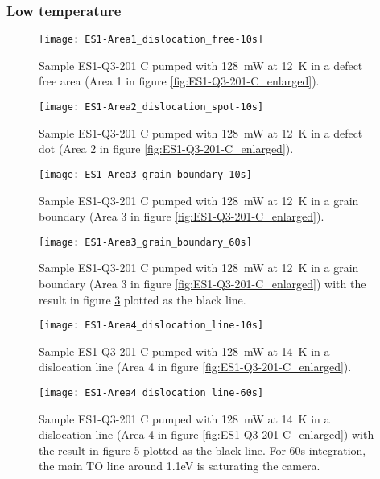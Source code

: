 \subsubsection{Low temperature}

\begin{figure}[H]
\centering
\texttt{[image: ES1-Area1\_dislocation\_free-10s]}
\caption[ES1-Q3-201 at a defect free area]{Sample ES1-Q3-201 C pumped with 128~mW at 12~K in a defect free area (Area 1 in figure \ref{fig:ES1-Q3-201-C_enlarged}).}
\label{fig:ES1-Area1_dislocation_free-10s}%
\end{figure}

\begin{figure}[H]
\centering
\texttt{[image: ES1-Area2\_dislocation\_spot-10s]}
\caption[ES1-Q3-201 at a defect free area]{Sample ES1-Q3-201 C pumped with 128~mW at 12~K in a defect dot (Area 2 in figure \ref{fig:ES1-Q3-201-C_enlarged}).}
\label{fig:ES1-Area2_dislocation_spot-10s}%
\end{figure}


\begin{figure}[H]
\centering
\texttt{[image: ES1-Area3\_grain\_boundary-10s]}
\caption[ES1-Q3-201 at a grain boundary]{Sample ES1-Q3-201 C pumped with 128~mW at 12~K in a grain boundary (Area 3 in figure \ref{fig:ES1-Q3-201-C_enlarged}).}
\label{fig:ES1-Area3_grain_boundary-10s}%
\end{figure}

\begin{figure}[H]
\centering
\texttt{[image: ES1-Area3\_grain\_boundary\_60s]}
\caption[ES1-Q3-201 at a grain boundary]{Sample ES1-Q3-201 C pumped with 128~mW at 12~K in a grain boundary (Area 3 in figure \ref{fig:ES1-Q3-201-C_enlarged}) with the result in figure \ref{fig:ES1-Area3_grain_boundary-10s} plotted as the black line.}
\label{fig:ES1-Area3_grain_boundary_60s}%
\end{figure}


\begin{figure}[H]
\centering
\texttt{[image: ES1-Area4\_dislocation\_line-10s]}
\caption[ES1-Q3-201 at a dislocation line]{Sample ES1-Q3-201 C pumped with 128~mW at 14~K in a dislocation line (Area 4 in figure \ref{fig:ES1-Q3-201-C_enlarged}).}
\label{fig:ES1-Area4_dislocation_line-10s}%
\end{figure}

\begin{figure}[H]
\centering
\texttt{[image: ES1-Area4\_dislocation\_line-60s]}
\caption[ES1-Q3-201 at a dislocation line]{Sample ES1-Q3-201 C pumped with 128~mW at 14~K in a dislocation line (Area 4 in figure \ref{fig:ES1-Q3-201-C_enlarged}) with the result in figure \ref{fig:ES1-Area4_dislocation_line-10s} plotted as the black line. For 60s integration, the main TO line around 1.1eV is saturating the camera.}
\label{fig:ES1-Area4_dislocation_line-60s}%
\end{figure}



